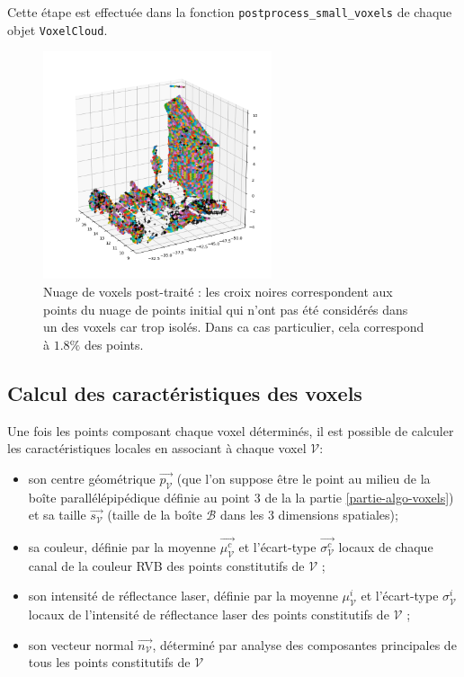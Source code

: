 \documentclass[a4paper, onecolumn, 11pt]{article}
\newcommand{\V}{\mathcal{V}}
\begin{document}
Cette étape est effectuée dans la fonction \texttt{postprocess\_small\_voxels} de chaque objet \texttt{VoxelCloud}.

\begin{figure}[h]
    \centering
    \includegraphics[width=0.6\textwidth]{fig/with_unassociated_points.png}
    \caption{Nuage de voxels post-traité : les croix noires correspondent aux points du nuage de points initial qui n'ont pas été considérés dans un des voxels car trop isolés. Dans ca cas particulier, cela correspond à $1.8\%$ des points.}
    \label{fig:non-associes}
\end{figure}

\subsection{Calcul des caractéristiques des voxels}
\label{partie-caracteristiques-voxels}
Une fois les points composant chaque voxel déterminés, il est possible de calculer les caractéristiques locales en associant à chaque voxel $\V$:

\begin{itemize}
\item son centre géométrique $\overrightarrow{p_\V}$ (que l'on suppose être le point au milieu de la boîte parallélépipédique définie au point 3 de la la partie \ref{partie-algo-voxels}) et sa taille $\overrightarrow{s_\V}$ (taille de la boîte $\mathcal{B}$ dans les 3 dimensions spatiales);
\item sa couleur, définie par la moyenne $\overrightarrow{\mu_\V^c}$ et l'écart-type $\overrightarrow{\sigma_\V^c}$ locaux de chaque canal de la couleur RVB des points constitutifs de $\mathcal{V}$ ;
\item son intensité de réflectance laser, définie par la moyenne $\mu_\V^i$ et l'écart-type $\sigma_\V^i$ locaux de l'intensité de réflectance laser des points constitutifs de $\mathcal{V}$ ;
\item son vecteur normal $\overrightarrow{n_\V}$, déterminé par analyse des composantes principales de tous les points constitutifs de $\mathcal{V}$
\end{itemize}
\end{document}
